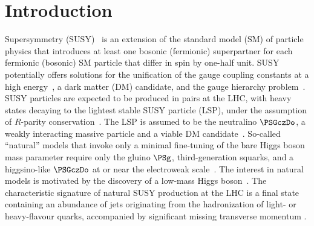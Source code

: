 
\section{Introduction}
\label{sec:introduction}

Supersymmetry (SUSY)~\cite{ref:SUSY-1, ref:SUSY0, ref:SUSY3,
  ref:SUSY1} is an extension of the standard model (SM) of particle
physics that introduces at least one bosonic (fermionic) superpartner
for each fermionic (bosonic) SM particle that differ in spin by
one-half unit. SUSY potentially offers solutions for the unification
of the gauge coupling constants at a high
energy~\cite{Dimopoulos:1981yj, Ibanez:1981yh, Marciano:1981un}, a
dark matter (DM) candidate, and the gauge hierarchy
problem~\cite{ref:hierarchy1, ref:hierarchy2}. SUSY particles are
expected to be produced in pairs at the LHC, with heavy states
decaying to the lightest stable SUSY particle (LSP), under the
assumption of $R$-parity conservation~\cite{Farrar:1978xj}. The LSP is
assumed to be the neutralino $\PSGczDo$, a weakly interacting massive
particle and a viable DM candidate~\cite{Jungman:1995df,
  1674-1137-38-9-090001}.  So-called ``natural'' models that invoke
only a minimal fine-tuning of the bare Higgs boson mass parameter
require only the gluino $\PSg$, third-generation squarks, and a
higgsino-like $\PSGczDo$ at or near the electroweak
scale~\cite{ref:barbierinsusy}. The interest in natural models is
motivated by the discovery of a low-mass Higgs
boson~\cite{Aad:2012tfa, Chatrchyan:2012ufa, Chatrchyan:2013lba,
  Khachatryan:2014jba, Aad:2014aba, Aad:2015zhl}. The characteristic
signature of natural SUSY production at the LHC is a final state
containing an abundance of jets originating from the hadronization of
light- or heavy-flavour quarks, accompanied by significant missing
transverse momentum \ptvecmiss.


